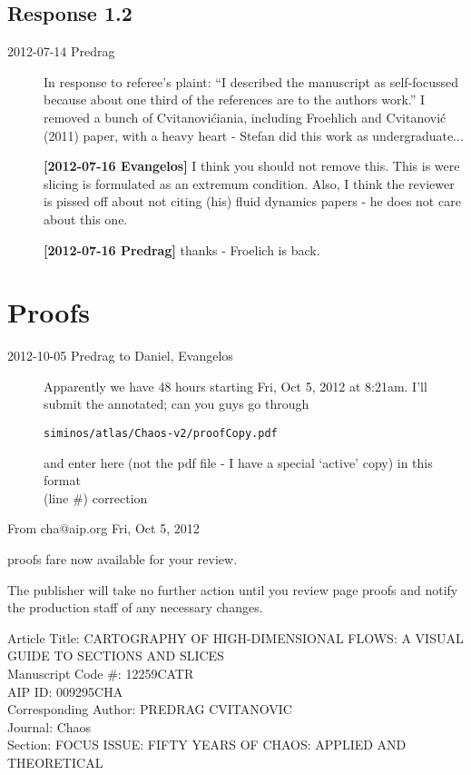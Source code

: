 \subsection{Response 1.2}
\label{sect:Response1.2}

\begin{description}

\item[2012-07-14 Predrag] In response to referee's plaint:
``I described the manuscript as self-focussed because about one third of
the references are to the authors work.'' I removed a bunch of
Cvitanovi\'ciania, including Froehlich and Cvitanovi\'c (2011) paper, with
a heavy heart - Stefan did this work as undergraduate...

{\bf [2012-07-16 Evangelos]} I think you should not remove this. This is were
		slicing is formulated as an extremum condition. Also,
		I think the reviewer is pissed off about not citing (his)
		fluid dynamics papers - he does not care about this one.

{\bf [2012-07-16 Predrag]} thanks - Froelich is back.


\end{description}

\section{Proofs}

\begin{description}

\item[2012-10-05 Predrag to Daniel, Evangelos] Apparently we have 48
hours starting Fri, Oct 5, 2012 at 8:21am. I'll submit the annotated; can
you guys go through

\texttt{siminos/atlas/Chaos-v2/proofCopy.pdf}

\noindent
and enter here (not the pdf file - I have a special `active' copy) in
this format
\\
(line \#) correction

\end{description}



From cha@aip.org Fri, Oct 5, 2012

proofs fare now available for your review.

The publisher will take no further action until you review page proofs
and notify the production staff of any necessary changes.

\noindent
Article Title: CARTOGRAPHY OF HIGH-DIMENSIONAL FLOWS:
               A VISUAL GUIDE TO SECTIONS AND SLICES\\
Manuscript Code \#: 12259CATR\\
AIP ID: 009295CHA\\
Corresponding Author: PREDRAG CVITANOVIC\\
Journal: Chaos\\
Section: FOCUS ISSUE: FIFTY YEARS OF CHAOS: APPLIED AND THEORETICAL\\

